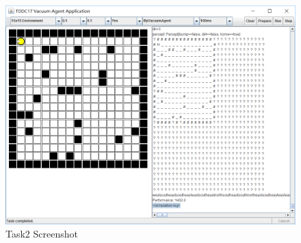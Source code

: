 \begin{figure}[h]
    \centering
      \includegraphics[width=0.83\linewidth]{./images/task2.png}
    \caption{Task2 Screenshot\label{VacuumAgent}}
\end{figure}
\thispagestyle{empty}

